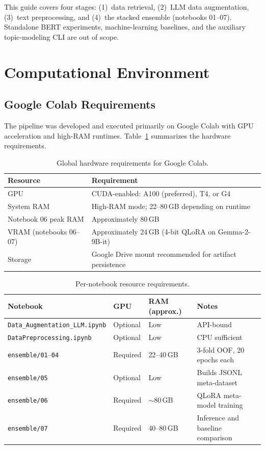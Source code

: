 \documentclass[11pt,a4paper]{article}
\newcommand{\repo}[1]{\texttt{#1}}
\begin{document}
This guide covers four stages: (1)~data retrieval, (2)~LLM data augmentation, (3)~text preprocessing, and (4)~the stacked ensemble (notebooks 01--07). Standalone BERT experiments, machine-learning baselines, and the auxiliary topic-modeling CLI are out of scope.

\section{Computational Environment}
\label{sec:environment}

\subsection{Google Colab Requirements}

The pipeline was developed and executed primarily on Google Colab with GPU acceleration and high-RAM runtimes. Table~\ref{tab:hardware} summarizes the hardware requirements.

\begin{table}[htbp]
  \centering
  \caption{Global hardware requirements for Google Colab.}
  \label{tab:hardware}
  \begin{tabular}{@{}ll@{}}
    \toprule
    Resource & Requirement \\
    \midrule
    GPU & CUDA-enabled: A100 (preferred), T4, or G4 \\
    System RAM & High-RAM mode; 22--80\,GB depending on runtime \\
    Notebook 06 peak RAM & Approximately 80\,GB \\
    VRAM (notebooks 06--07) & Approximately 24\,GB (4-bit QLoRA on Gemma-2-9B-it) \\
    Storage & Google Drive mount recommended for artifact persistence \\
    \bottomrule
  \end{tabular}
\end{table}

\begin{table}[htbp]
  \centering
  \caption{Per-notebook resource requirements.}
  \label{tab:notebook-resources}
  \small
  \begin{tabular}{@{}llll@{}}
    \toprule
    Notebook & GPU & RAM (approx.) & Notes \\
    \midrule
    \repo{Data\_Augmentation\_LLM.ipynb} & Optional & Low & API-bound \\
    \repo{DataPreprocessing.ipynb} & Optional & Low & CPU sufficient \\
    \repo{ensemble/01}--\repo{04} & Required & 22--40\,GB & 3-fold OOF, 20 epochs each \\
    \repo{ensemble/05} & Optional & Low & Builds JSONL meta-dataset \\
    \repo{ensemble/06} & Required & $\sim$80\,GB & QLoRA meta-model training \\
    \repo{ensemble/07} & Required & 40--80\,GB & Inference and baseline comparison \\
    \bottomrule
  \end{tabular}
\end{table}
\end{document}
